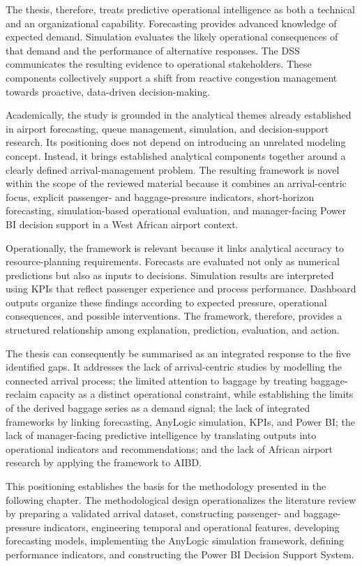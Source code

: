 The thesis, therefore, treats predictive operational intelligence as both a technical and an organizational capability. Forecasting provides advanced knowledge of expected demand. Simulation evaluates the likely operational consequences of that demand and the performance of alternative responses. The DSS communicates the resulting evidence to operational stakeholders. These components collectively support a shift from reactive congestion management towards proactive, data-driven decision-making.

Academically, the study is grounded in the analytical themes already established in airport forecasting, queue management, simulation, and decision-support research. Its positioning does not depend on introducing an unrelated modeling concept. Instead, it brings established analytical components together around a clearly defined arrival-management problem. The resulting framework is novel within the scope of the reviewed material because it combines an arrival-centric focus, explicit passenger- and baggage-pressure indicators, short-horizon forecasting, simulation-based operational evaluation, and manager-facing Power BI decision support in a West African airport context.

Operationally, the framework is relevant because it links analytical accuracy to resource-planning requirements. Forecasts are evaluated not only as numerical predictions but also as inputs to decisions. Simulation results are interpreted using KPIs that reflect passenger experience and process performance. Dashboard outputs organize these findings according to expected pressure, operational consequences, and possible interventions. The framework, therefore, provides a structured relationship among explanation, prediction, evaluation, and action.

The thesis can consequently be summarised as an integrated response to the five identified gaps. It addresses the lack of arrival-centric studies by modelling the connected arrival process; the limited attention to baggage by treating baggage-reclaim capacity as a distinct operational constraint, while establishing the limits of the derived baggage series as a demand signal; the lack of integrated frameworks by linking forecasting, AnyLogic simulation, KPIs, and Power BI; the lack of manager-facing predictive intelligence by translating outputs into operational indicators and recommendations; and the lack of African airport research by applying the framework to AIBD.

This positioning establishes the basis for the methodology presented in the following chapter. The methodological design operationalizes the literature review by preparing a validated arrival dataset, constructing passenger- and baggage-pressure indicators, engineering temporal and operational features, developing forecasting models, implementing the AnyLogic simulation framework, defining performance indicators, and constructing the Power BI Decision Support System.